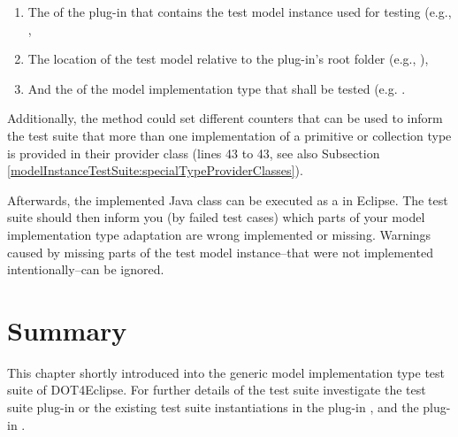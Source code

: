 \begin{enumerate}
	\item The  of the plug-in that contains the test model instance used for testing (e.g., ,
	\item The location of the test model relative to the plug-in's root folder (e.g., ),
	\item And the  of the model implementation type that shall be tested (e.g. .
\end{enumerate}

Additionally, the method could set different counters that can be used to inform the test suite that more than one implementation of a primitive or collection type is provided in their provider class (lines 43 to 43, see also Subsection \ref{modelInstanceTestSuite:specialTypeProviderClasses}).

Afterwards, the implemented Java class can be executed as a  in Eclipse. The test suite should then inform you (by failed test cases) which parts of your model implementation type adaptation are wrong implemented or missing. Warnings caused by missing parts of the test model instance--that were not implemented intentionally--can be ignored.


\section{Summary}

This chapter shortly introduced into the generic model implementation type test suite of \acl{DOT4Eclipse}. For further details of the test suite investigate the test suite plug-in  or the existing test suite instantiations in the plug-in , and the plug-in .

